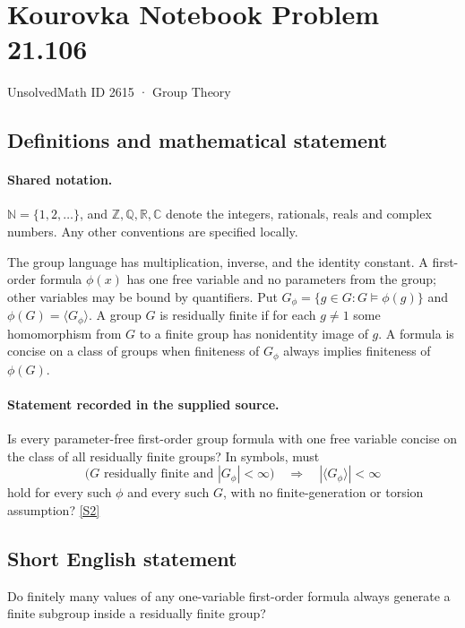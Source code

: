 \documentclass[11pt]{article}
\newcommand{\sref}[2]{\hyperlink{source:#1:#2}{[S#2]}}
\begin{document}
\setcounter{section}{2614}
\section{Kourovka Notebook Problem 21.106}\label{2615}
{\small\sffamily UnsolvedMath ID 2615 · Group Theory}
\subsection{Definitions and mathematical statement}

\paragraph{Shared notation.}$\mathbb N=\{1,2,\ldots\}$, and $\mathbb Z,\mathbb Q,\mathbb R,\mathbb C$ denote the integers, rationals, reals and complex numbers. Any other conventions are specified locally.


The group language has multiplication, inverse, and the identity constant. A first-order formula $\phi(x)$ has one free variable and no parameters from the group; other variables may be bound by quantifiers. Put $G_\phi=\{g\in G:G\models\phi(g)\}$ and $\phi(G)=\langle G_\phi\rangle$. A group $G$ is residually finite if for each $g\ne1$ some homomorphism from $G$ to a finite group has nonidentity image of $g$. A formula is concise on a class of groups when finiteness of $G_\phi$ always implies finiteness of $\phi(G)$.
\paragraph{Statement recorded in the supplied source.}
Is every parameter-free first-order group formula with one free variable concise on the class of all residually finite groups? In symbols, must
\[
 \bigl(G\text{ residually finite and }|G_\phi|<\infty\bigr)
 \quad\Longrightarrow\quad|\langle G_\phi\rangle|<\infty
\]
hold for every such $\phi$ and every such $G$, with no finite-generation or torsion assumption? \sref{2615}{2}
\subsection{Short English statement}
Do finitely many values of any one-variable first-order formula always generate a finite subgroup inside a residually finite group?
\end{document}
